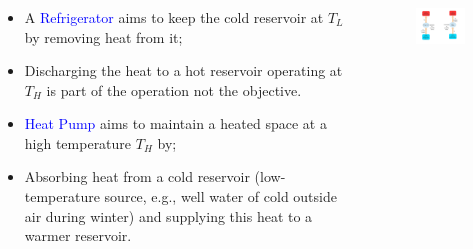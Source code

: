 \documentclass[10pt,compress]{beamer}
\begin{document}
\begin{frame}
 \frametitle{}
  \begin{columns}
   \begin{column}[c]{0.45\linewidth}
    \begin{itemize}
     \item <1-> A \textcolor{blue}{Refrigerator} aims to keep the cold reservoir at $T_{L}$ by removing heat from it;
     \item <2-> Discharging the heat to a hot reservoir operating at $T_{H}$ is part of the operation not the objective.
     \item <3-> \textcolor{blue}{Heat Pump} aims to maintain a heated space at a high temperature $T_{H}$ by;
     \item <4-> Absorbing heat from a cold reservoir (low-temperature source, e.g., well water of cold outside air during winter) and supplying this heat to a warmer reservoir.
    \end{itemize}
   \end{column}
   \begin{column}[c]{0.55\linewidth}
    \begin{figure}%
     \begin{center}
      \includegraphics[width=7.5cm,clip]{./Pics/Overview_Refrig2}
     \end{center}
    \end{figure}  
   \end{column}  
  \end{columns}
\end{frame}
\end{document}
